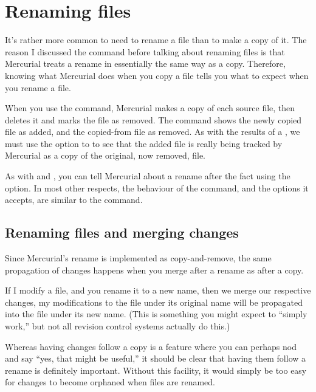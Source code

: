 \section{Renaming files}

It's rather more common to need to rename a file than to make a copy
of it.  The reason I discussed the  command before talking
about renaming files is that Mercurial treats a rename in essentially
the same way as a copy.  Therefore, knowing what Mercurial does when
you copy a file tells you what to expect when you rename a file.

When you use the  command, Mercurial makes a copy of
each source file, then deletes it and marks the file as removed.
The  command shows the newly copied file as added, and
the copied-from file as removed.
As with the results of a , we must use the
 option to  to see that the added file
is really being tracked by Mercurial as a copy of the original, now
removed, file.

As with  and , you can tell Mercurial about
a rename after the fact using the  option.  In
most other respects, the behaviour of the  command, and
the options it accepts, are similar to the  command.

\subsection{Renaming files and merging changes}

Since Mercurial's rename is implemented as copy-and-remove, the same
propagation of changes happens when you merge after a rename as after
a copy.

If I modify a file, and you rename it to a new name, then we merge our
respective changes, my modifications to the file under its original
name will be propagated into the file under its new name.  (This is
something you might expect to ``simply work,'' but not all revision
control systems actually do this.)

Whereas having changes follow a copy is a feature where you can
perhaps nod and say ``yes, that might be useful,'' it should be clear
that having them follow a rename is definitely important.  Without
this facility, it would simply be too easy for changes to become
orphaned when files are renamed.


